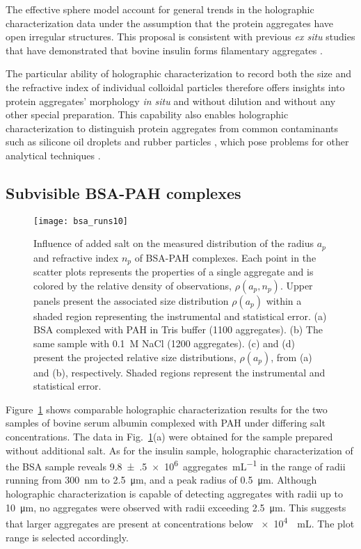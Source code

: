 The effective sphere model account for general
trends in the holographic characterization data under
the assumption that the protein aggregates have 
open irregular structures.
This proposal is consistent with previous \emph{ex situ}
studies that have demonstrated that bovine insulin forms filamentary aggregates
\cite{omichi14,yip98,yip98a}.

The particular ability of holographic characterization to record
both the size and the refractive index of individual colloidal
particles therefore offers insights into
protein aggregates' morphology \emph{in situ} and
without dilution and without any other special preparation.
This capability also enables holographic characterization to
distinguish protein aggregates from common contaminants
such as silicone oil droplets and rubber particles 
\cite{wang15}, which pose problems for other analytical techniques
\cite{demeule10}.

\subsection{Subvisible BSA-PAH complexes}
\label{sec:bsa}

\begin{figure}[!t]
  \centering
  \texttt{[image: bsa\_runs10]}
  \caption[Influence of salt on BSA-PAH complexes]
    {Influence of added salt on the measured distribution 
    of the radius $a_p$ and refractive index $n_p$
    of BSA-PAH complexes.
    Each point in the scatter plots represents the properties of a single aggregate
    and is colored by the relative density of observations,
    $\rho(a_p,n_p)$.  Upper panels present the associated
    size distribution $\rho(a_p)$ within a shaded region
    representing the instrumental and statistical error.
    (a) BSA complexed with PAH in Tris buffer (1100 aggregates).
    (b) The same sample with \SI{0.1}{M} NaCl (1200 aggregates).
    (c) and (d) present the projected relative size distributions, $\rho(a_p)$, 
    from (a) and (b), respectively. Shaded regions represent the instrumental and
    statistical error.}
  \label{fig:bsa_runs}
\end{figure}

Figure~\ref{fig:bsa_runs} shows comparable holographic
characterization results for the two samples of bovine serum albumin complexed with PAH under differing salt concentrations.
The data in Fig.~\ref{fig:bsa_runs}(a) were obtained for the sample
prepared without additional salt.
As for the insulin sample, holographic characterization of the BSA
sample reveals 
\SI{9.8(5)e6}{aggregates\per\mL} in the range of radii running
from \SI{300}{\nm} to \SI{2.5}{\um}, and a
peak radius of \SI{0.5}{\um}.
Although holographic characterization is capable of detecting aggregates with 
radii up to \SI{10}{\um}, no aggregates were observed with radii exceeding \SI{2.5}{\um}.
This suggests that larger aggregates are present at concentrations
below \SI{e4}{\per\mL}. The plot range is selected accordingly.

